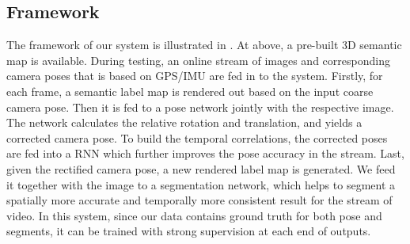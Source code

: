 \subsection{Framework}
\label{sub:framework}
The framework of our system is illustrated in . At above, a pre-built 3D semantic map is available. During testing, an online stream of images and corresponding camera poses that is based on GPS/IMU are fed in to the system. Firstly, for each frame, a semantic label map is rendered out based on the input coarse camera pose. Then it is fed to a pose network jointly with the respective image.  The network calculates the relative rotation and translation, and yields a corrected camera pose. To build the temporal correlations, the corrected poses are fed into a RNN which further improves the pose accuracy in the stream.
Last, given the rectified camera pose, a new rendered label map is generated. We feed it together with the image to a segmentation network, which helps to segment a spatially more accurate and temporally more consistent result for the stream of video.
In this system, since our data contains ground truth for both pose and segments, it can be trained with strong supervision at each end of outputs.
